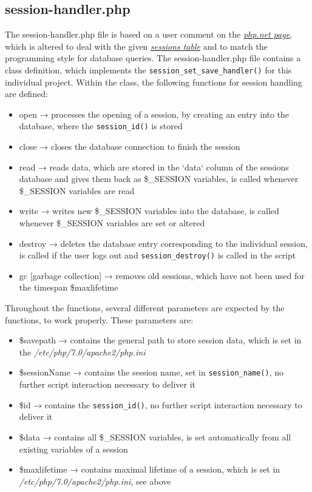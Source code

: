 \subsection{session-handler.php}\label{session-handler}
The session-handler.php file is based on a user comment on the \href{https://secure.php.net/manual/de/function.session-set-save-handler.php#118225}{\textit{php.net page}}, 
which is altered to deal with the given \hyperref[sessions_database]{\textit{sessions table}} and to match the programming style for database queries. The session-handler.php file 
contains a class definition, which implements the \texttt{session\_set\_save\_handler()} for this individual project. Within the class, the following functions for session handling 
are defined:
\begin{itemize}
\item open → processes the opening of a session, by creating an entry into the database, where the \texttt{session\_id()} is stored
\item close → closes the database connection to finish the session
\item read → reads data, which are stored in the `data` column of the sessions database and gives them back as \$\_SESSION variables, is called whenever \$\_SESSION variables are read
\item write → writes new \$\_SESSION variables into the database, is called whenever \$\_SESSION variables are set or altered
\item destroy → deletes the database entry corresponding to the individual session, is called if the user logs out and \texttt{session\_destroy()} is called in the script
\item gc [garbage collection] → removes old sessions, which have not been used for the timespan \$maxlifetime
\end{itemize}
Throughout the functions, several different parameters are expected by the functions, to work properly. These parameters are:
\begin{itemize}
 \item \$savepath → contains the general path to store session data, which is set in the \emph{/etc/php/7.0/apache2/php.ini}
 \item \$sessionName → contains the session name, set in \texttt{session\_name()}, no further script interaction necessary to deliver it
 \item \$id → contains the \texttt{session\_id()}, no further script interaction necessary to deliver it
 \item \$data → contains all \$\_SESSION variables, is set automatically from all existing variables of a session
 \item \$maxlifetime → contains maximal lifetime of a session, which is set in \emph{/etc/php/7.0/apache2/php.ini}, see above
\end{itemize}
